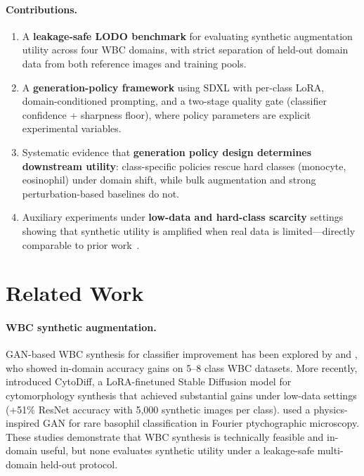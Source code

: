 \documentclass[10pt,twocolumn]{article}
\begin{document}
\paragraph{Contributions.}
\begin{enumerate}[leftmargin=*,nosep]
\item A \textbf{leakage-safe LODO benchmark} for evaluating synthetic
  augmentation utility across four WBC domains, with strict separation
  of held-out domain data from both reference images and training pools.
\item A \textbf{generation-policy framework} using SDXL with per-class
  LoRA, domain-conditioned prompting, and a two-stage quality gate
  (classifier confidence + sharpness floor), where policy parameters are
  explicit experimental variables.
\item Systematic evidence that \textbf{generation policy design
  determines downstream utility}: class-specific policies rescue hard
  classes (monocyte, eosinophil) under domain shift, while bulk
  augmentation and strong perturbation-based baselines do not.
\item Auxiliary experiments under \textbf{low-data and hard-class
  scarcity} settings showing that synthetic utility is amplified when
  real data is limited---directly comparable to prior
  work~\citep{Boada_2025}.
\end{enumerate}

\section{Related Work}
\label{sec:related}

\paragraph{WBC synthetic augmentation.}
GAN-based WBC synthesis for classifier improvement has been explored by
\citet{Almezhghwi_2020} and \citet{Jung_2022}, who showed in-domain
accuracy gains on 5--8 class WBC datasets. More recently,
\citet{Boada_2025} introduced CytoDiff, a LoRA-finetuned Stable
Diffusion model for cytomorphology synthesis that achieved substantial
gains under low-data settings (+51\% ResNet accuracy with 5{,}000
synthetic images per class). \citet{Hassini_2025} used a physics-inspired
GAN for rare basophil classification in Fourier ptychographic microscopy.
These studies demonstrate that WBC synthesis is technically feasible and
in-domain useful, but none evaluates synthetic utility under a
leakage-safe multi-domain held-out protocol.
\end{document}
